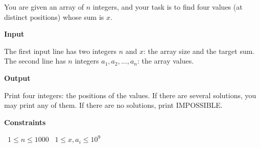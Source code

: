 You are given an array of $n$ integers, and your task is to find four values (at distinct positions) whose sum is $x$.

\vspace{0.3cm}\noindent\textbf{Input}

The first input line has two integers $n$ and $x$: the array size and the target sum.
The second line has $n$ integers $a_1,a_2,\dots,a_n$: the array values.

\vspace{0.3cm}\noindent\textbf{Output}

Print four integers: the positions of the values. If there are several solutions, you may print any of them. If there are no solutions, print IMPOSSIBLE.

\vspace{0.3cm}\noindent\textbf{Constraints}

\textbullet\ $1 \le n \le 1000$
\textbullet\ $1 \le x,a_i \le 10^9$